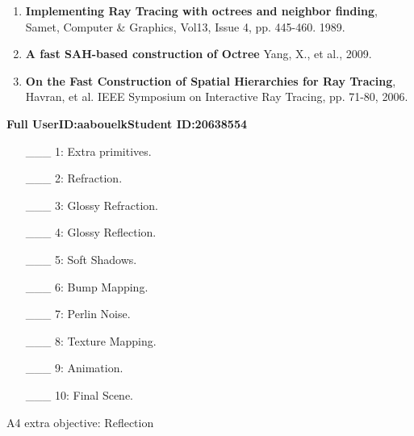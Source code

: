 \documentclass {article}
\begin{document}
\begin{description}
\begin{enumerate}
	\item {\bf Implementing Ray Tracing with octrees and neighbor finding}, Samet, Computer \& Graphics, Vol13, Issue 4, pp. 445-460. 1989.
	
	\item {\bf A fast SAH-based construction of Octree} Yang, X., et al., 2009.
	
	\item {\bf On the Fast Construction of Spatial Hierarchies for Ray Tracing}, Havran, et al. IEEE Symposium on Interactive Ray Tracing, pp. 71-80, 2006.
	
     \end{enumerate}

\end{description}
\newpage



{\hfill{\bf Full UserID:aabouelk}\hfill{\bf Student ID:20638554}\hfill}

\begin{enumerate}
     \item[\_\_\_ 1:]  Extra primitives.
     
     \item[\_\_\_ 2:]  Refraction.

     \item[\_\_\_ 3:]  Glossy Refraction.
     
     \item[\_\_\_ 4:]  Glossy Reflection.
     
     \item[\_\_\_ 5:]  Soft Shadows.

     \item[\_\_\_ 6:]  Bump Mapping.

     \item[\_\_\_ 7:]  Perlin Noise.

     \item[\_\_\_ 8:]  Texture Mapping.

     \item[\_\_\_ 9:]  Animation.
     
     \item[\_\_\_ 10:]  Final Scene.

\end{enumerate}

 A4 extra objective: Reflection\\
 
\end{document}
